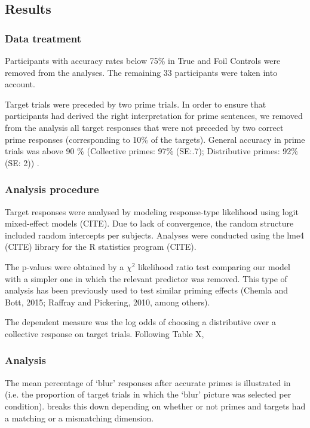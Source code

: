 \documentclass[a4paper, 11pt]{article}
\begin{document}
\subsection{Results}

\subsubsection{Data treatment}

Participants with accuracy rates below 75\% in True and Foil Controls were removed from the analyses. The remaining 33 participants were taken into account. 

Target trials were preceded by two prime trials. 
In order to ensure that participants had derived the right interpretation for prime sentences, we removed from the analysis all target responses that were not preceded by two correct prime responses (corresponding to 10\% of the targets). General accuracy in prime trials was above 90 \% (Collective primes: 97\% (SE:.7); Distributive primes: 92\%(SE: 2)) . 


\subsubsection{Analysis procedure}
Target responses were analysed by modeling response-type likelihood using logit mixed-effect models (CITE). Due to lack of convergence, the random structure included random intercepts per subjects. Analyses were conducted using the lme4 (CITE) library for the R statistics program (CITE). 

The p-values were obtained by a $\chi^{2}$ likelihood ratio test comparing our model with a simpler one in which the relevant predictor was removed. This type of analysis has been previously used to test similar priming effects (Chemla and Bott, 2015; Raffray and Pickering, 2010, among others).

The dependent measure was the log odds of choosing a distributive over a collective response on target trials. 
Following Table X, 


\subsubsection{Analysis}
The mean percentage of `blur' responses after accurate primes is illustrated in  (i.e. the proportion of target trials in which the `blur' picture was selected per condition).  
 breaks this down depending on whether or not primes and targets had a matching or a mismatching dimension. 
\end{document}
